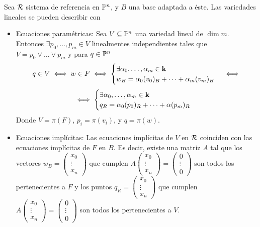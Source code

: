 \begin{obs}
    Sea $\mathcal{R}$ sistema de referencia en $\mathbb{P}^n$, y $B$ una base adaptada a éste. Las variedades lineales se pueden describir con
    \begin{itemize}
        \item Ecuaciones paramétricas: Sea $V \subseteq \mathbb{P}^n$ una variedad lineal de $\dim m$. Entonces
        $\exists p_0, \dots, p_m \in V$ linealmentes independientes tales que $V = p_0 \vee \dots \vee p_m$ y para $q \in \mathbb{P}^n$
        \[
            q \in V \iff w \in F \iff 
            \begin{cases} 
                \exists \alpha_0, \dots, \alpha_m \in \mathbf{k} \\ 
                w_B = \alpha_0(v_0)_B + \dots + \alpha_m(v_m)_B 
            \end{cases} 
            \iff
            \]
        \[
            \iff 
            \begin{cases}
                \exists \alpha_0, \dots, \alpha_m \in \mathbf{k} \\ 
                q_R = \alpha_0 (p_0)_R + \dots + \alpha (p_m)_R 
            \end{cases}
        \]
        Donde $V = \pi(F)$, $p_i = \pi(v_i)$, y $q = \pi(w)$.
        \item Ecuaciones implícitas: Las ecuaciones implícitas de $V$ en $\mathcal{R}$ coinciden con las ecuaciones implícitas de $F$ en
        $B$. Es decir, existe una matriz $A$ tal que los vectores $w_B = \begin{pmatrix} x_0 \\ \vdots \\ x_n \end{pmatrix}$ que cumplen $A \begin{pmatrix} x_0 \\ \vdots \\ x_n \end{pmatrix} = 
        \begin{pmatrix} 0 \\ \vdots \\ 0 \end{pmatrix}$ son todos los pertenecientes a $F$ y los puntos 
        $q_R = \begin{pmatrix} x_0 \\ \vdots \\ x_n \end{pmatrix}$ que cumplen $A \begin{pmatrix} x_0 \\ \vdots \\ x_n \end{pmatrix} = 
        \begin{pmatrix} 0 \\ \vdots \\ 0 \end{pmatrix}$ son todos los pertenecientes a $V$.
    \end{itemize}
\end{obs}

